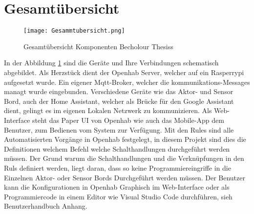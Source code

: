 \section{Gesamtübersicht}
\begin{figure}[H]
\centering
\texttt{[image: Gesammtubersicht.png]}
\caption{Gesamtübersicht Komponenten Becholour Thesiss }
\label{pic: Gesamtübersicht}
\end{figure}
In der Abbildung \ref{pic: Gesamtübersicht} sind die Geräte und Ihre Verbindungen schematisch abgebildet. Als Herzstück dient der Openhab Server, welcher auf ein Rasperrypi aufgesetzt wurde. Ein eigener Mqtt-Broker, welcher die kommunikations-Messages managt wurde eingebunden. Verschiedene Geräte wie das Aktor- und Sensor Bord, auch der Home Assistant, welcher als Brücke für den Google Assistant dient, gelingt es im eigenen Lokalen Netzwerk zu kommunizieren. Als Web-Interface steht das Paper UI von Openhab wie auch das Mobile-App dem Benutzer, zum Bedienen vom System zur Verfügung. Mit den Rules sind alle Automatisierten Vorgänge in Openhab festgelegt, in diesem Projekt sind dies die Definitionen welchem Befehl welche Schalthandlungen durchgeführt werden müssen. Der Grund warum die Schalthandlungen und die Verknüpfungen in den Ruls definiert werden, liegt daran, dass so keine Programmiereingriffe in die Einzelnen Aktor- oder Sensor Bords Durchgeführt werden müssen. Der Benutzer kann die Konfigurationen in Openhab Graphisch im Web-Interface oder als Programmiercode in einem Editor wie Visual Studio Code durchführen, sieh Benutzerhandbuch Anhang.    





